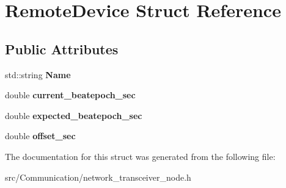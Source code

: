 \hypertarget{structRemoteDevice}{}\section{Remote\+Device Struct Reference}
\label{structRemoteDevice}
\subsection*{Public Attributes}
\begin{DoxyCompactItemize}
\item 
\mbox{\label{structRemoteDevice_aea5d7bdbcbb2db2de1fad0d366d15d10}} 
std\+::string {\bfseries Name}
\item 
\mbox{\label{structRemoteDevice_a8c16be8d56e77649f586d2b77e717fe4}} 
double {\bfseries current\+\_\+beatepoch\+\_\+sec}
\item 
\mbox{\label{structRemoteDevice_ae9e97cc993e74c8ce3d1b761d76841dd}} 
double {\bfseries expected\+\_\+beatepoch\+\_\+sec}
\item 
\mbox{\label{structRemoteDevice_a21ae985853fe7e6cfbc4d4cd78c2a4c8}} 
double {\bfseries offset\+\_\+sec}
\end{DoxyCompactItemize}


The documentation for this struct was generated from the following file\+:\begin{DoxyCompactItemize}
\item 
src/\+Communication/network\+\_\+transceiver\+\_\+node.\+h\end{DoxyCompactItemize}
